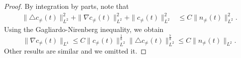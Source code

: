 \documentclass[12pt, reqno]{amsart}
\numberwithin{equation}{section}
\begin{document}
	\begin{proof}
		By integration by parts, note that
		\begin{equation}
			\begin{aligned}
				\|\triangle c_{\neq}(t)\|^2_{L^2}+\|\nabla c_{\neq}(t)\|^2_{L^2}
				+\|c_{\neq}(t)\|^2_{L^2}
				&\leq C\|n_{\neq}(t)\|^2_{L^2}.
				\nonumber
			\end{aligned}
		\end{equation}
		Using the Gagliardo-Nirenberg inequality, we obtain
		$$\|\nabla c_{\neq}(t)\|_{L^4}\leq
		C\| c_{\neq}(t)\|^{\frac{1}{8}}_{L^2}
		\|\triangle c_{\neq}(t)\|^{\frac{7}{8}}_{L^2}
		\leq C\|n_{\neq}(t)\|_{L^2}.$$
		Other results are similar and we omitted it.
		
		
	\end{proof}
	
\end{document}
